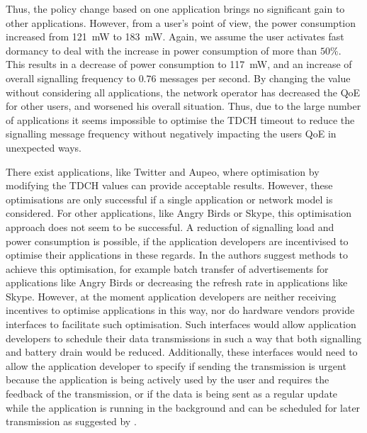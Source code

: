 Thus, the policy change based on one application brings no significant gain to other applications.
However, from a user's point of view, the power consumption increased from \SI{121}{\milli\watt} to \SI{183}{\milli\watt}.
Again, we assume the user activates fast dormancy to deal with the increase in power consumption of more than $50\%$.
This results in a decrease of power consumption to \SI{117}{\milli\watt}, and an increase of overall signalling frequency to \(0.76\) messages per second.
By changing the value without considering all applications, the network operator has decreased the \gls{QoE} for other users, and worsened his overall situation.
Thus, due to the large number of applications it seems impossible to optimise the \gls{TDCH} timeout to reduce the signalling message frequency without negatively impacting the users \gls{QoE} in unexpected ways.

There exist applications, like Twitter and Aupeo, where optimisation by modifying the \gls{TDCH} values can provide acceptable results.
However, these optimisations are only successful if a single application or network model is considered.
For other applications, like Angry Birds or Skype, this optimisation approach does not seem to be successful.
A reduction of signalling load and power consumption is possible, if the application developers are incentivised to optimise their applications in these regards.
In \cite{Qian2011} the authors suggest methods to achieve this optimisation, for example batch transfer of advertisements for applications like Angry Birds or decreasing the refresh rate in applications like Skype.
However, at the moment application developers are neither receiving incentives to optimise applications in this way, nor do hardware vendors provide interfaces to facilitate such optimisation.
Such interfaces would allow application developers to schedule their data transmissions in such a way that both signalling and battery drain would be reduced.
Additionally, these interfaces would need to allow the application developer to specify if sending the transmission is urgent because the application is being actively used by the user and requires the feedback of the transmission, or if the data is being sent as a regular update while the application is running in the background and can be scheduled for later transmission as suggested by \cite{calder2010, vergara2012}.

